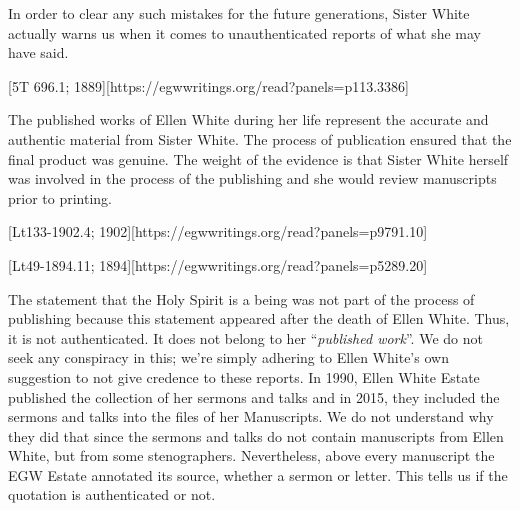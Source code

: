 In order to clear any such mistakes for the future generations, Sister White actually warns us when it comes to unauthenticated reports of what she may have said.

[5T 696.1; 1889][https://egwwritings.org/read?panels=p113.3386]

The published works of Ellen White during her life represent the accurate and authentic material from Sister White. The process of publication ensured that the final product was genuine. The weight of the evidence is that Sister White herself was involved in the process of the publishing and she would review manuscripts prior to printing.

[Lt133-1902.4; 1902][https://egwwritings.org/read?panels=p9791.10]

[Lt49-1894.11; 1894][https://egwwritings.org/read?panels=p5289.20]

The statement that the Holy Spirit is a being was not part of the process of publishing because this statement appeared after the death of Ellen White. Thus, it is not authenticated. It does not belong to her “\textit{published work}”. We do not seek any conspiracy in this; we’re simply adhering to Ellen White’s own suggestion to not give credence to these reports. In 1990, Ellen White Estate published the collection of her sermons and talks and in 2015, they included the sermons and talks into the files of her Manuscripts. We do not understand why they did that since the sermons and talks do not contain manuscripts from Ellen White, but from some stenographers. Nevertheless, above every manuscript the EGW Estate annotated its source, whether a sermon or letter. This tells us if the quotation is authenticated or not.

